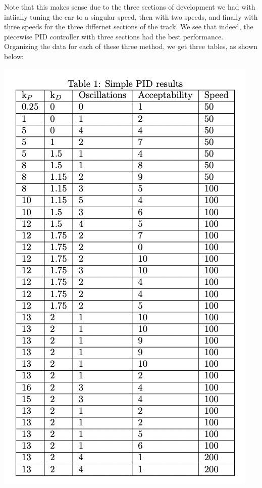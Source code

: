 \documentclass[12pt]{article}
\begin{document}
\begin{multicols}{2}
Note that this makes sense due to the three sections of development we had with intiially tuning the car to a singular speed, then with two speeds, and 
finally with three speeds for the three differnet sections of the track. We see that indeed, the piecewise PID controller with three sections had the best performance.
Organizing the data for each of these three method, we get three tables, as shown below:
\begin{center}
    \includegraphics*[scale=0.3]{Table1.png}
\end{center}
\begin{center}

\end{center}
\end{multicols}
\end{document}
